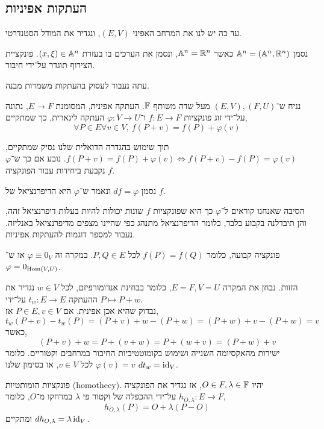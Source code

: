 \subsection{העתקות אפיניות}
עד כה יש לנו את המרחב האפיני $(E, V)$, ונגדיר את המודל הסטנדרטי.
\begin{definition}
	נסמן $\mathbb{A}^n = (\mathbb{A}^n, \mathbb{R}^n)$ כאשר $\mathbb{A}^n = \mathbb{R}^n$, ונסמן את הערכים בו בעזרת $(x, \xi) \in \mathbb{A}^n$.
	פונקציית הצירוף תוגדר על־ידי חיבור.
\end{definition}
עתה נעבור לעסוק בהעתקות משמרות מבנה.
\begin{definition}
	נניח ש־$(E, V), (F, U)$ מעל שדה משותף $\mathbb{F}$.
	העתקה אפינית, המסומנת $E \to F$, נתונה על־ידי זוג פונקציות $f : E \to F$ ו־$\varphi : V \to U$ העתקה לינארית,
	כך שמתקיים,
	\[
		\forall P \in E \forall v \in V,\ f(P + v) = f(P) + \varphi(v)
	\]
\end{definition}
\begin{remark}
	תוך שימוש בהגדרה הדואלית שלנו נסיק שמתקיים, $f(P + v) = f(P) + \varphi(v) \iff f(P + v) - f(P) = \varphi(v)$.
	נובע אם כך ש־$\varphi$ נקבעת ביחידות עבור הפונקציה $f$.
\end{remark}
\begin{notation}
	נסמן $df = \varphi$ ונאמר ש־$\varphi$ היא הדיפרנציאל של $f$.
\end{notation}
הסיבה שאנחנו קוראים ל־$\varphi$ כך היא שפונקציות $f$ שונות יכולות להיות בעלות דיפרנציאל זהה, והן תיבדלנה בקבוע בלבד, כלומר הדיפרנציאל מתנהג כפי שהיינו מצפים מדיפרנציאל באנליזה.
נעבור למספר דוגמות להעתקות אפיניות.
\begin{example}
	פונקציה קבועה, כלומר $f(P) = f(Q)$ לכל $P, Q \in E$.
	במקרה זה $\varphi \equiv 0_V$ או ש־$\varphi = 0_{\operatorname{Hom}(V, U)}$.
\end{example}
\begin{example}
	הזזות. נבחן את המקרה $E = F, V = U$, כלומר בבחינת אנדומורפיזם, לכל $w \in V$ נגדיר את ההעתקה $t_w : E \to E$ על־ידי $P \mapsto P + w$. \\
	נבדוק שהיא אכן אפינית,
	אם $P \in E, v \in V$ אז,
	\[
		t_w(P + v) - t_w(P)
		= (P + v) + w - (P + w)
		= (P + w) + v - (P + w)
		= v
	\]
	כאשר,
	\[
		(P + v) + w
		= P + (v + w)
		= P + (w + v)
		= (P + w) + v
	\]
	ישירות מהאקסיומה השנייה ושימוש בקומוטטיביות החיבור במרחבים וקטוריים.
	כלומר $\varphi(v) = v$ לכל $v \in V$, או בסימון שלנו $dt_w = \operatorname{id}_V$.
\end{example}
\begin{example}
	פונקציות הומותטיות (homothecy).
	יהיו $O \in F, \lambda \in \mathbb{F}$, אז נגדיר את הפונקציה $h_{O, \lambda} : E \to F$ על־ידי ההכפלה של וקטור פי $\lambda$ במרחקו מ־$O$, כלומר,
	\[
		h_{O, \lambda}(P) = O + \lambda(P - O)
	\]
	ומתקיים $dh_{O, \lambda} = \lambda \operatorname{id}_V$.
\end{example}
